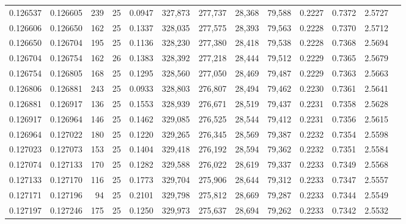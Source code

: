 \begin{tabular}{rrrrrrrrrrrrr}
0.126537 & 0.126605 &   239 &  25 &                                     0.0947 & 327,873 & 277,737 &  28,368 &  79,588 & 0.2227 & 0.7372 & 2.5727 \\
0.126606 & 0.126650 &   162 &  25 &                                     0.1337 & 328,035 & 277,575 &  28,393 &  79,563 & 0.2228 & 0.7370 & 2.5712 \\
0.126650 & 0.126704 &   195 &  25 &                                     0.1136 & 328,230 & 277,380 &  28,418 &  79,538 & 0.2228 & 0.7368 & 2.5694 \\
0.126704 & 0.126754 &   162 &  26 &                                     0.1383 & 328,392 & 277,218 &  28,444 &  79,512 & 0.2229 & 0.7365 & 2.5679 \\
0.126754 & 0.126805 &   168 &  25 &                                     0.1295 & 328,560 & 277,050 &  28,469 &  79,487 & 0.2229 & 0.7363 & 2.5663 \\
0.126806 & 0.126881 &   243 &  25 &                                     0.0933 & 328,803 & 276,807 &  28,494 &  79,462 & 0.2230 & 0.7361 & 2.5641 \\
0.126881 & 0.126917 &   136 &  25 &                                     0.1553 & 328,939 & 276,671 &  28,519 &  79,437 & 0.2231 & 0.7358 & 2.5628 \\
0.126917 & 0.126964 &   146 &  25 &                                     0.1462 & 329,085 & 276,525 &  28,544 &  79,412 & 0.2231 & 0.7356 & 2.5615 \\
0.126964 & 0.127022 &   180 &  25 &                                     0.1220 & 329,265 & 276,345 &  28,569 &  79,387 & 0.2232 & 0.7354 & 2.5598 \\
0.127023 & 0.127073 &   153 &  25 &                                     0.1404 & 329,418 & 276,192 &  28,594 &  79,362 & 0.2232 & 0.7351 & 2.5584 \\
0.127074 & 0.127133 &   170 &  25 &                                     0.1282 & 329,588 & 276,022 &  28,619 &  79,337 & 0.2233 & 0.7349 & 2.5568 \\
0.127133 & 0.127170 &   116 &  25 &                                     0.1773 & 329,704 & 275,906 &  28,644 &  79,312 & 0.2233 & 0.7347 & 2.5557 \\
0.127171 & 0.127196 &    94 &  25 &                                     0.2101 & 329,798 & 275,812 &  28,669 &  79,287 & 0.2233 & 0.7344 & 2.5549 \\
0.127197 & 0.127246 &   175 &  25 &                                     0.1250 & 329,973 & 275,637 &  28,694 &  79,262 & 0.2233 & 0.7342 & 2.5532 \\

\end{tabular}
